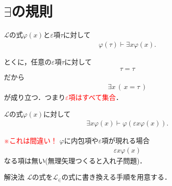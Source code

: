 \section{$\exists$の規則}
	\begin{screen}
		\begin{logicalaxm}
			$\mathcal{L}$の式$\varphi(x)$と$\varepsilon$項$\tau$に対して
			\begin{align}
				\varphi(\tau) \vdash \exists x \varphi(x).
			\end{align}
		\end{logicalaxm}
	\end{screen}
	
	とくに，任意の$\varepsilon$項$\tau$に対して
	\begin{align}
		\tau = \tau
	\end{align}
	だから
	\begin{align}
		\exists x\, (\, x = \tau\, )
	\end{align}
	が成り立つ．つまり\textcolor{red}{$\varepsilon$項はすべて集合}．
	
\newpage
	\begin{screen}
		\begin{logicalaxm}
			$\mathcal{L}$の式$\varphi(x)$に対して
			\begin{align}
				\exists x \varphi(x) \vdash \varphi(\varepsilon x \varphi(x)).
			\end{align}
		\end{logicalaxm}
	\end{screen}
	
	\textcolor{red}{※これは間違い！}
	$\varphi$に内包項や$\varepsilon$項が現れる場合
	\begin{align}
		\varepsilon x \varphi(x)
	\end{align}
	なる項は無い(無理矢理つくると入れ子問題)．
	
	
	\begin{itembox}[l]{解決法}
		$\mathcal{L}$の式を$\mathcal{L}_{\in}$の式に書き換える手順を用意する．
	\end{itembox}